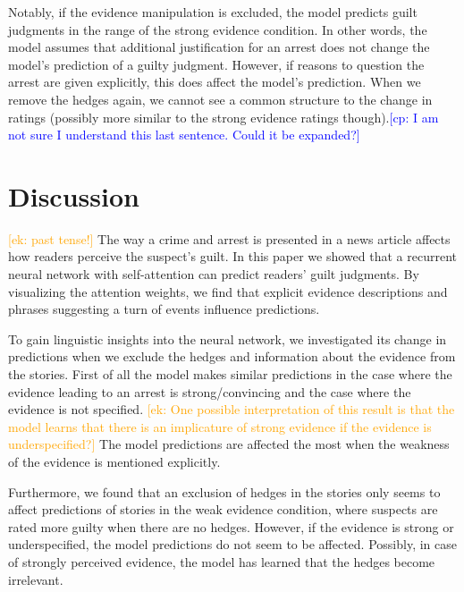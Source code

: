 \documentclass[11pt,a4paper]{article}
\newcommand{\ek}[1]{\textcolor{Orange}{[ek: #1]}}
\newcommand{\cp}[1]{\textcolor{Blue}{[cp: #1]}}
\begin{document}
Notably, if the evidence manipulation is excluded, the model predicts guilt judgments in the range of the strong evidence condition. In other words, the model assumes that additional justification for an arrest does not change the model's prediction of a guilty judgment. However, if reasons to question the arrest are given explicitly, this does affect the model's prediction. When we remove the hedges again, we cannot see a common structure to the change in ratings (possibly more similar to the strong evidence ratings though).\cp{I am not sure I understand this last sentence. Could it be expanded?}

%
%

\section{Discussion}
\ek{past tense!}
The way a crime and arrest is presented in a news article affects how readers perceive the suspect's guilt. In this paper we showed that a recurrent neural network with self-attention can predict readers' guilt judgments. 
By visualizing the attention weights, we find that explicit evidence descriptions and phrases suggesting a turn of events influence predictions. 

To gain linguistic insights into the neural network, we investigated its change in predictions when we exclude the hedges and information about the evidence from the stories. First of all the model makes similar predictions in the case where the evidence leading to an arrest is strong/convincing and the case where the evidence is not specified. 
\ek{One possible interpretation of this result is that the model learns that there is an implicature of strong evidence if the evidence is underspecified?} The model predictions are affected the most when the weakness of the evidence is mentioned explicitly.

Furthermore, we found that an exclusion of hedges in the stories only seems to affect predictions of stories in the weak evidence condition, where suspects are rated more guilty when there are no hedges. However, if the evidence is strong or underspecified, the model predictions do not seem to be affected. 
Possibly, in case of strongly perceived evidence, the model has learned that the hedges become irrelevant.
\end{document}
